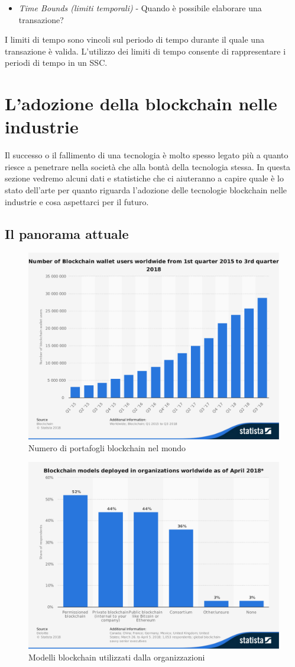 \begin{itemize}
	\item \textit{Time Bounds (limiti temporali)} -
	      Quando è possibile elaborare una transazione?
\end{itemize}
I limiti di tempo sono vincoli sul periodo di tempo durante il quale
una transazione è valida. L'utilizzo dei limiti di tempo
consente di rappresentare i periodi di tempo in un SSC.

\section{L'adozione della blockchain nelle industrie}
Il successo o il fallimento di una tecnologia è molto spesso legato più a quanto riesce a penetrare
nella società che alla bontà della tecnologia stessa.
In questa sezione vedremo alcuni dati e statistiche che ci aiuteranno a capire quale è
lo stato dell'arte per quanto riguarda l'adozione delle tecnologie blockchain nelle industrie
e cosa aspettarci per il futuro.

\subsection{Il panorama attuale}
\begin{figure}[H]
	\centering
	\includegraphics[width=.75\linewidth]{images/chap_intro/number-of-blockchain-wallet.pdf}
	\caption{Numero di portafogli blockchain nel mondo \cite{number-of-blockchain-wallet}}
\end{figure}
\begin{figure}[H]
	\centering
	\includegraphics[width=.75\linewidth]{images/chap_intro/model-focus-for-blockchain.pdf}
	\caption{Modelli blockchain utilizzati dalla organizzazioni \cite{model-focus-for-blockchain}}
\end{figure}

